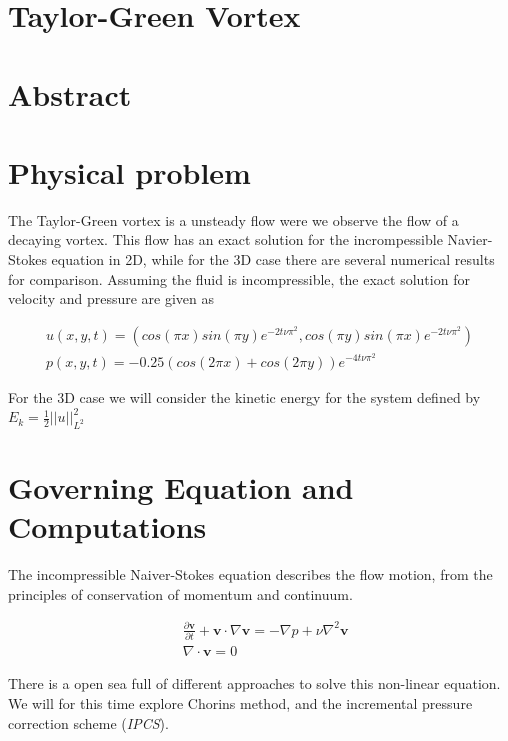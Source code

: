 \documentclass[a4paper,norsk]{article}
\begin{document}
\maketitle
\section*{Taylor-Green Vortex}

\section*{Abstract}

\section*{Physical problem}
The Taylor-Green vortex is a unsteady flow were we observe the flow of a decaying
vortex. This flow has an exact solution for the incrompessible Navier-Stokes equation in 2D, while for the 3D
case there are several numerical results for comparison.
Assuming the fluid is incompressible, the exact solution for velocity and pressure are given as

\begin{align}
u(x,y,t) = (cos(\pi x)sin(\pi y) e^{-2 t \nu \pi^{2} }, cos(\pi y)sin(\pi x) e^{-2 t \nu \pi^2} ) \\
p(x,y,t) = -0.25(cos(2\pi x) + cos(2 \pi y) ) e^{-4 t \nu \pi^2}
\end{align}


For the 3D case we will consider the kinetic energy for the system defined by $E_k = \frac{1}{2}||u||^2_{L^2}$

\section*{Governing Equation and Computations}
The incompressible Naiver-Stokes equation describes the flow motion, from the principles of conservation of momentum
and continuum.

\begin{align}
&\frac{\partial \textbf{v}}{\partial t} + \textbf{v} \cdot \nabla \textbf{v} =
-\nabla p + \nu \nabla^2 \textbf{v} \\
&\nabla \cdot \textbf{v} = 0
\end{align}

There is a open sea full of different approaches to solve this non-linear equation. We will for this
time explore Chorins method, and the incremental pressure correction scheme (\textit{IPCS}).
\end{document}
